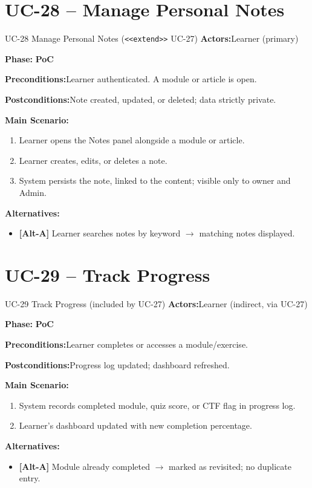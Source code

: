 \documentclass[12pt,a4paper]{report}
\newcommand{\ucfield}[2]{%
    \noindent\textbf{\color{helixpurplemid}#1:}\quad #2\par\medskip
}
\newcommand{\ucphase}[1]{%
    \noindent\textbf{\color{helixpurplemid}Phase:}\quad%
    \ifstrequal{#1}{PoC}{\textcolor{helixteal}{\textbf{PoC}}}{\textcolor{helixamber}{\textbf{Future MVP}}}%
    \par\medskip
}
\begin{document}
\section{UC-28 -- Manage Personal Notes}
\begin{ucbox}{UC-28 \quad Manage Personal Notes \textnormal{(\texttt{<<extend>>} UC-27)}}
    \ucfield{Actors}{Learner (primary)}
    \ucphase{PoC}
    \ucfield{Preconditions}{Learner authenticated. A module or article is open.}
    \ucfield{Postconditions}{Note created, updated, or deleted; data strictly private.}
    \textbf{\color{helixpurplemid}Main Scenario:}
    \begin{enumerate}
        \item Learner opens the Notes panel alongside a module or article.
        \item Learner creates, edits, or deletes a note.
        \item System persists the note, linked to the content; visible only to owner and Admin.
    \end{enumerate}
    \textbf{\color{helixpurplemid}Alternatives:}
    \begin{itemize}
        \item \textbf{[Alt-A]} Learner searches notes by keyword $\rightarrow$ matching notes displayed.
    \end{itemize}
\end{ucbox}

\section{UC-29 -- Track Progress}
\begin{ucbox}{UC-29 \quad Track Progress \textnormal{(included by UC-27)}}
    \ucfield{Actors}{Learner (indirect, via UC-27)}
    \ucphase{PoC}
    \ucfield{Preconditions}{Learner completes or accesses a module/exercise.}
    \ucfield{Postconditions}{Progress log updated; dashboard refreshed.}
    \textbf{\color{helixpurplemid}Main Scenario:}
    \begin{enumerate}
        \item System records completed module, quiz score, or CTF flag in progress log.
        \item Learner's dashboard updated with new completion percentage.
    \end{enumerate}
    \textbf{\color{helixpurplemid}Alternatives:}
    \begin{itemize}
        \item \textbf{[Alt-A]} Module already completed $\rightarrow$ marked as revisited; no duplicate entry.
    \end{itemize}
\end{ucbox}
\end{document}
